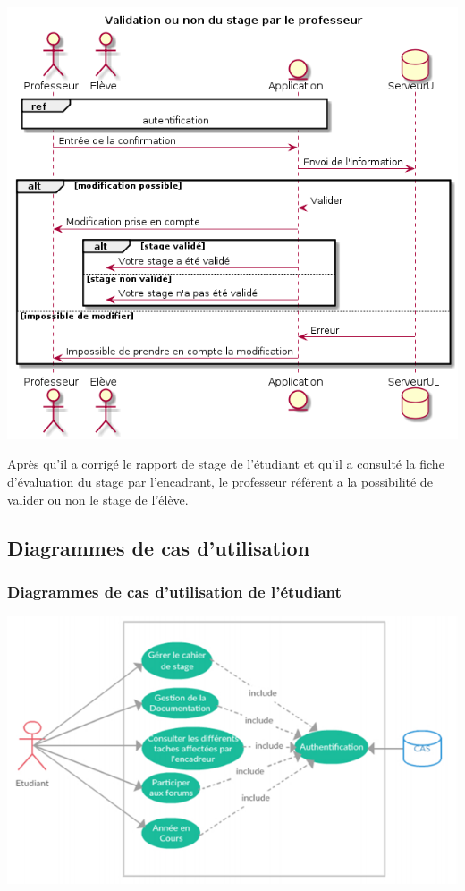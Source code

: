 \documentclass{scrreprt}
\begin{document}
\begin{center}
	\includegraphics[scale=0.55]{image/validationStage.png}
\end{center}
\hspace{1cm}Après qu'il a corrigé le rapport de stage de l'étudiant et qu'il a consulté la fiche d'évaluation du stage par l'encadrant, le professeur référent a la possibilité de valider ou non le stage de l'élève.

\subsection{Diagrammes de cas d'utilisation}
\subsubsection{Diagrammes de cas d'utilisation de l'étudiant}
\begin{center}
	\includegraphics[scale=0.55]{image/casutilisationetudiant.png}
\end{center}
\end{document}
